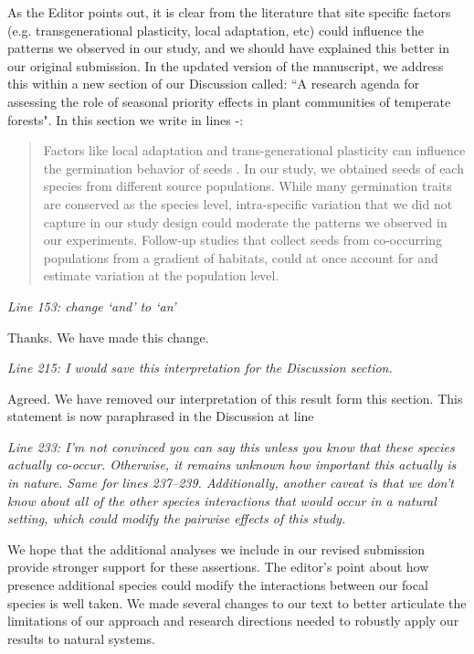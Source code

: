 \documentclass[11pt]{article}
\begin{document}
As the Editor points out, it is clear from the literature that site specific factors (e.g.  transgenerational plasticity, local adaptation, etc) could influence the patterns we observed in our study, and we should have explained this better in our original submission. In the updated version of the manuscript, we address this within a new section of our Discussion called: ``A research agenda for assessing the role of seasonal priority effects in plant communities of temperate forests". In this section we write in lines -:

\begin{quote}Factors like local adaptation and trans-generational plasticity can influence the germination behavior of seeds \citep{Donohue:2010uy,Baughman:2019ty}. In our study, we obtained seeds of each species from different source populations. While many germination traits are conserved as the species level, intra-specific variation that we did not capture in our study design could moderate the patterns we observed in our experiments. Follow-up studies that collect seeds from co-occurring populations from a gradient of habitats, could at once account for and estimate variation at the population level.\end{quote}

\emph{Line 153: change ‘and’ to ‘an’}

Thanks. We have made this change.

\emph{Line 215: I would save this interpretation for the Discussion section.}

Agreed. We have removed our interpretation of this result form this section. This statement is now paraphrased in the Discussion at line 

\emph{Line 233:  I’m not convinced you can say this unless you know that these species actually co-occur. Otherwise, it remains unknown how important this actually is in nature. Same for lines 237–239. Additionally, another caveat is that we don’t know about all of the other species interactions that would occur in a natural setting, which could modify the pairwise effects of this study.}

We hope that the additional analyses we include in our revised submission provide stronger support for these assertions. The editor's point about how presence additional species could modify the interactions between our focal species is well taken. We made several changes to our text to better articulate the limitations of our approach and research directions needed to robustly apply our results to natural systems.
\end{document}
